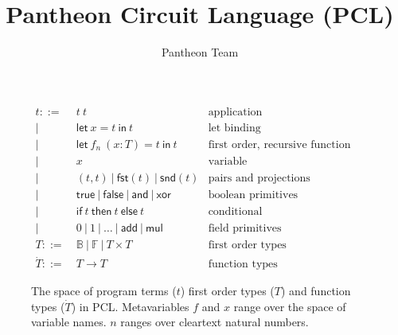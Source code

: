 \documentclass[11pt]{article}
\title{Pantheon Circuit Language (PCL)}
\author{Pantheon Team}
\newcommand{\kw}[1]{\textsf{#1}}
\newcommand{\klet}{\kw{let}}
\newcommand{\kin}{\kw{in}}
\newcommand{\kfst}{\kw{fst}}
\newcommand{\ksnd}{\kw{snd}}
\newcommand{\ktrue}{\kw{true}}
\newcommand{\kfalse}{\kw{false}}
\newcommand{\kand}{\kw{and}}
\newcommand{\kxor}{\kw{xor}}
\newcommand{\kif}{\kw{if}}
\newcommand{\kthen}{\kw{then}}
\newcommand{\kelse}{\kw{else}}
\newcommand{\kadd}{\kw{add}}
\newcommand{\kmul}{\kw{mul}}
\begin{document}
\maketitle

\begin{figure}
\begin{align*}
  t ::=&~t~t &\text{application}\\
  	  |&~\klet~x=t~\kin~t &\text{let binding}\\
  	  |&~\klet~f_n~(x:T)=t~\kin~t &\text{first order, recursive function definition}\\
  	  |&~x &\text{variable}\\
  	  |&~(t, t)~|~\kfst(t)~|~\ksnd(t) &\text{pairs and projections}\\
  	  |&~\ktrue~|~\kfalse~|~\kand~|~\kxor &\text{boolean primitives}\\
  	  |&~\kif~t~\kthen~t~\kelse~t &\text{conditional}\\
  	  |&~0~|~1~|~\ldots~|~\kadd~|~\kmul &\text{field primitives}\\
  T ::=&~\mathbb{B}~|~\mathbb{F}~|~T\times T &\text{first order types}\\
  \dot{T} ::=&~T \rightarrow T &\text{function types}
\end{align*}
\caption{%
The space of program terms ($t$) first order types ($T$) and function types ($\dot{T}$) in PCL.
Metavariables $f$ and $x$ range over the space of variable names.
$n$ ranges over cleartext natural numbers.
}\label{fig:spaces}
\end{figure}
\end{document}
